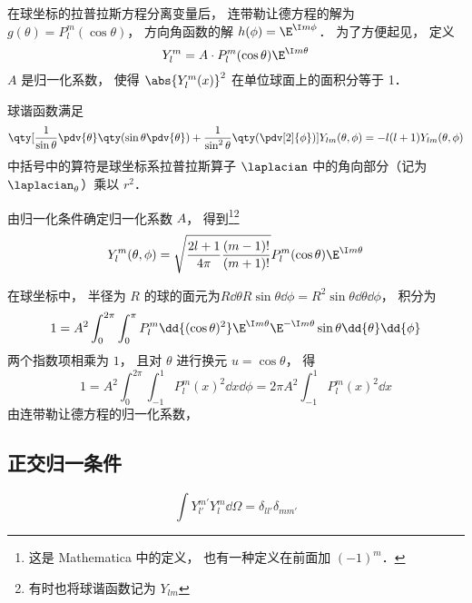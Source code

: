 

在球坐标的拉普拉斯方程分离变量后， 连带勒让德方程的解为 $g(\theta) = P_l^m(\cos\theta)$， 方向角函数的解 $h(\phi) = \E^{\I m\phi}$． 为了方便起见， 定义
\begin{equation}
Y_l^m = A \cdot P_l^m(\cos \theta) \E^{\I m\theta}
\end{equation}
$A$ 是归一化系数， 使得 $\abs{Y_l^m (x)}^2$ 在单位球面上的面积分等于 1．

球谐函数满足
\begin{equation}
\qty[\frac{1}{\sin\theta}\pdv{\theta} \qty(\sin \theta \pdv{\theta}) + \frac{1}{\sin^2 \theta} \qty(\pdv[2]{\phi})]Y_{lm}(\theta, \phi) = -l(l+1)Y_{lm}(\theta, \phi)
\end{equation}
中括号中的算符是球坐标系拉普拉斯算子 $\laplacian$ 中的角向部分（记为 $\laplacian_\theta$）乘以 $r^2$．

由归一化条件确定归一化系数 $A$， 得到\footnote{这是 Mathematica 中的定义， 也有一种定义在前面加 $(-1)^m$．}\footnote{有时也将球谐函数记为 $Y_{lm}$}
\begin{equation}
Y_l^m (\theta ,\phi) = \sqrt{\frac{2l + 1}{4\pi }\frac{(m - 1)!}{(m + 1)!}} P_l^m (\cos\theta) \E^{\I m\theta}
\end{equation}

在球坐标中， 半径为 $R$ 的球的面元为$R \dd{\theta} R\sin\theta \dd{\phi} = R^2 \sin\theta \dd{\theta} \dd{\phi}$，  积分为
\begin{equation}
1 = A^2\int_0^{2\pi } \int_0^\pi  P_l^m \dd{(\cos \theta)^2} \E^{\I m\theta} \E^{-\I m\theta}\sin\theta \dd{\theta} \dd{\phi}
\end{equation}
两个指数项相乘为 $1$，  且对 $\theta$ 进行换元 $u = \cos\theta $， 得
\begin{equation}
1 = A^2 \int_0^{2\pi} \int_{-1}^1 P_l^m {{(x)}^2} \dd{x} \dd{\phi} = 2\pi A^2 \int_{-1}^1 P_l^m (x)^2 \dd{x} 
\end{equation}
由连带勒让德方程的归一化系数， %


\subsection{正交归一条件}
\begin{equation}
\int Y_{l'}^{m'} Y_l^m \dd{\Omega} = \delta_{ll'}\delta_{mm'}
\end{equation}


